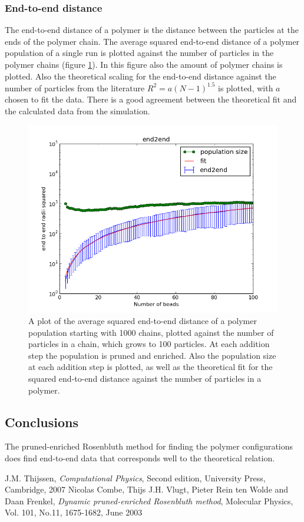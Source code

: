 \documentclass{article}
\begin{document}
\begin{multicols}{2}
\subsubsection*{End-to-end distance}
The end-to-end distance of a polymer is the distance between the particles at the ends of the polymer chain. The average squared end-to-end distance of a polymer population of a single run is plotted against the number of particles in the polymer chains (figure \ref{fig:end2end}). In this figure also the amount of polymer chains is plotted. Also the theoretical scaling for the end-to-end distance against the number of particles from the literature $R^2=a(N-1)^{1.5}$ \cite{Jos}  is plotted, with $a$ chosen to fit the data. There is a good agreement between the theoretical fit and the calculated data from the simulation.
 \begin{figure}[ht]
\centering
\includegraphics[width=\textwidth]{betereplot.png}
\caption{A plot of the average squared end-to-end distance of a polymer population starting with 1000 chains, plotted against the number of particles in a chain, which grows to 100 particles. At each addition step the population is pruned and enriched. Also the population size at each addition step is plotted, as well as the theoretical fit for the squared end-to-end distance against the number of particles in a polymer. }
 \label{fig:end2end}
\end{figure} 
\subsection*{Conclusions}
The pruned-enriched Rosenbluth method  for finding the polymer configurations does find end-to-end data that corresponds well to the theoretical relation.
\begin{thebibliography}{9}
 J.M. Thijssen,\emph{ Computational Physics}, Second edition, University Press, Cambridge, 2007
 Nicolas Combe, Thijs J.H. Vlugt, Pieter Rein ten Wolde and Daan Frenkel, \emph{Dynamic pruned-enriched Rosenbluth method}, Molecular Physics, Vol. 101, No.11, 1675-1682, June 2003
\end{thebibliography}


\end{multicols}
\end{document}
